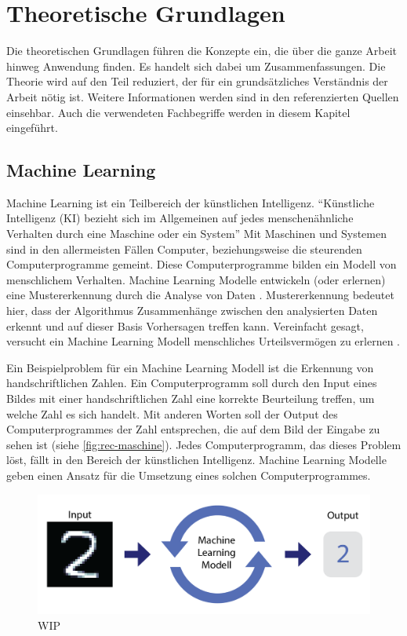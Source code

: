 \chapter{Theoretische Grundlagen}\label{chap:t}
Die theoretischen Grundlagen führen die Konzepte ein, die über die ganze Arbeit
hinweg Anwendung finden. Es handelt sich dabei um Zusammenfassungen. Die Theorie
wird auf den Teil reduziert, der für ein grundsätzliches Verständnis der Arbeit
nötig ist. Weitere Informationen werden sind in den referenzierten Quellen
einsehbar. Auch die verwendeten Fachbegriffe werden in diesem Kapitel
eingeführt. 

\section{Machine Learning}\label{chap:t_ml} Machine Learning ist ein Teilbereich
der künstlichen Intelligenz. ``Künstliche Intelligenz (KI) bezieht sich im
Allgemeinen auf jedes menschenähnliche Verhalten durch eine Maschine oder ein
System'' \cite{noauthor_what_nodate} Mit Maschinen und Systemen sind in den
allermeisten Fällen Computer, beziehungsweise die steurenden Computerprogramme
gemeint. Diese Computerprogramme bilden ein Modell von menschlichem Verhalten.
Machine Learning Modelle entwickeln (oder erlernen) eine Mustererkennung durch
die Analyse von Daten \cite{noauthor_what_nodate-1}. Mustererkennung bedeutet hier,
dass der Algorithmus Zusammenhänge zwischen den analysierten Daten erkennt und
auf dieser Basis Vorhersagen treffen kann. Vereinfacht gesagt, versucht ein
Machine Learning Modell menschliches Urteilsvermögen zu erlernen \cite{spaulding_is_2020}.

Ein Beispielproblem für ein Machine Learning Modell ist die Erkennung von
handschriftlichen Zahlen. Ein Computerprogramm soll durch den Input eines Bildes
mit einer handschriftlichen Zahl eine korrekte Beurteilung treffen, um welche
Zahl es sich handelt. Mit anderen Worten soll der Output des Computerprogrammes
der Zahl entsprechen, die auf dem Bild der Eingabe zu sehen ist (siehe \autoref{fig:rec-maschine}). Jedes
Computerprogramm, das dieses Problem löst, fällt in den Bereich der künstlichen
Intelligenz. Machine Learning Modelle geben einen Ansatz für die Umsetzung eines
solchen Computerprogrammes.

\begin{figure}[!ht]
    \centering
    \includegraphics[width=\textwidth]{images/theorie/rec-maschine.png}
    \caption{WIP}
    \label{fig:rec-maschine}
\end{figure}

